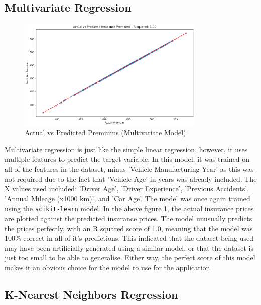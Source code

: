 \documentclass{article}
\begin{document}
\subsection{Multivariate Regression}
\begin{figure}[h]
\centering
\includegraphics[width=0.8\textwidth]{actual_vs_predicted.png}
\caption{Actual vs Predicted Premiums (Multivariate Model)}\label{fig:multivariate_regression}
\end{figure}

Multivariate regression is just like the simple linear regression, however, it uses multiple features to predict the target variable. In this model, it was trained on all of the features in the dataset, minus 'Vehicle Manufacturing Year' as this was not required due to the fact that 'Vehicle Age' in years was already included. The X values used included: 'Driver Age', 'Driver Experience', 'Previous Accidents', 'Annual Mileage (x1000 km)', and 'Car Age'. The model was once again trained using the \texttt{scikit-learn} model\cite{scikit_LR}. In the above figure \ref{fig:multivariate_regression}, the actual insurance prices are plotted against the predicted insurance prices. The model unusually predicts the prices perfectly, with an R squared score of 1.0, meaning that the model was 100\% correct in all of it's predictions. This indicated that the dataset being used may have been artificially generated using a similar model, or that the dataset is just too small to be able to generalise. Either way, the perfect score of this model makes it an obvious choice for the model to use for the application.

\newpage

\subsection{K-Nearest Neighbors Regression}
\end{document}
